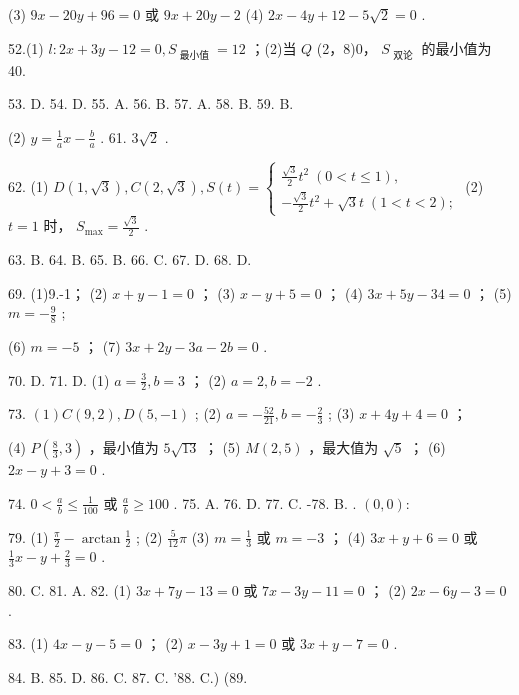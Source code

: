 \documentclass[10pt]{article}
\begin{document}
(3) \({9x} - {20y} + {96} = 0\) 或 \({9x} + {20y} - 2\) (4) \({2x} - {4y} + {12} - 5\sqrt{2} = 0\) .

52.(1) \(l : {2x} + {3y} - {12} = 0,{S}_{\text{ 最小值 }} = {12}\) ；(2)当 \(Q\) (2，8)0， \({S}_{\text{ 双论 }}\) 的最小值为 40.

53. D. 54. D. 55. A. 56. B. 57. A. 58. B. 59. B.

(2) \(y = \frac{1}{a}x - \frac{b}{a}\) . 61. \(3\sqrt{2}\) .

62. (1) \(D\left( {1,\sqrt{3}}\right) ,C\left( {2,\sqrt{3}}\right) ,S\left( t\right)  = \left\{  \begin{array}{l} \frac{\sqrt{3}}{2}{t}^{2}\;\left( {0 < t \leq  1}\right) , \\   - \frac{\sqrt{3}}{2}{t}^{2} + \sqrt{3}t\;\left( {1 < t < 2}\right) ; \end{array}\right.\) (2) \(t = 1\) 时， \({S}_{\max } = \frac{\sqrt{3}}{2}\) .

63. B. 64. B. 65. B. 66. C. 67. D. 68. D.

69. (1)9.-1； (2) \(x + y - 1 = 0\) ； (3) \(x - y + 5 = 0\) ； (4) \({3x} + {5y} - {34} = 0\) ； (5) \(m =  - \frac{9}{8}\) ;

(6) \(m =  - 5\) ； (7) \({3x} + {2y} - {3a} - {2b} = 0\) .

70. D. 71. D. (1) \(a = \frac{3}{2},b = 3\) ； (2) \(a = 2,b =  - 2\) .

73. \(\left( 1\right) C\left( {9,2}\right) ,D\left( {5, - 1}\right)\) ; (2) \(a =  - \frac{52}{21},b =  - \frac{2}{3}\) ; (3) \(x + {4y} + 4 = 0\) ；

(4) \(P\left( {\frac{8}{3},3}\right)\) ，最小值为 \(5\sqrt{13}\) ； (5) \(M\left( {2,5}\right)\) ，最大值为 \(\sqrt{5}\) ； (6) \({2x} - y + 3 = 0\) .

74. \(0 < \frac{a}{b} \leq  \frac{1}{100}\) 或 \(\frac{a}{b} \geq  {100}\) . 75. A. 76. D. 77. C. -78. B. . \(\left( {0,0}\right)  :\)

79. (1) \(\frac{\pi }{2} - \arctan \frac{1}{2}\) ; (2) \(\frac{5}{12}\pi\) (3) \(m = \frac{1}{3}\) 或 \(m =  - 3\) ； (4) \({3x} + y + 6 = 0\) 或 \(\frac{1}{3}x - y + \frac{2}{3} = 0\) .

80. C. 81. A. 82. (1) \({3x} + {7y} - {13} = 0\) 或 \({7x} - {3y} - {11} = 0\) ； (2) \({2x} - {6y} - 3 = 0\) .

83. (1) \({4x} - y - 5 = 0\) ； (2) \(x - {3y} + 1 = 0\) 或 \({3x} + y - 7 = 0\) .

84. B. 85. D. 86. C. 87. C. ’88. C.) (89.
\end{document}
